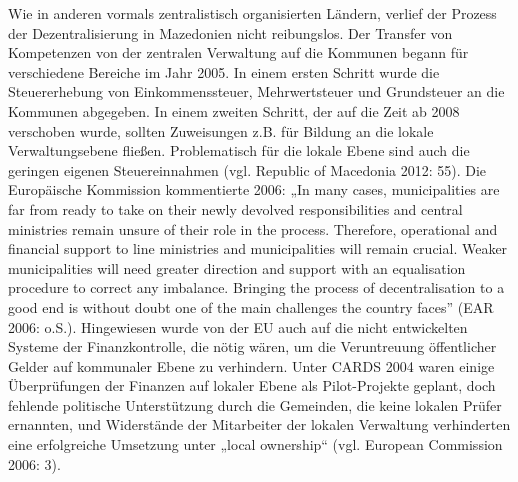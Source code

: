 Wie in anderen vormals zentralistisch organisierten Ländern, verlief der Prozess der Dezentralisierung in Mazedonien nicht reibungslos. Der Transfer von Kompetenzen von der zentralen Verwaltung auf die Kommunen begann für verschiedene Bereiche im Jahr 2005. In einem ersten Schritt wurde die Steuererhebung von Einkommenssteuer, Mehrwertsteuer und Grundsteuer an die Kommunen abgegeben. In einem zweiten Schritt, der auf die Zeit ab 2008 verschoben wurde, sollten Zuweisungen z.B. für Bildung an die lokale Verwaltungsebene fließen. Problematisch für die lokale Ebene sind auch die geringen eigenen Steuereinnahmen (vgl. Republic of Macedonia 2012: 55). Die Europäische Kommission kommentierte 2006: „In many cases, municipalities are far from ready to take on their newly devolved responsibilities and central ministries remain unsure of their role in the process. Therefore, operational and financial support to line ministries and municipalities will remain crucial. Weaker municipalities will need greater direction and support with an equalisation procedure to correct any imbalance. Bringing the process of decentralisation to a good end is without doubt one of the main challenges the country faces” (EAR 2006: o.S.). Hingewiesen wurde von der EU auch auf die nicht entwickelten Systeme der Finanzkontrolle, die nötig wären, um die Veruntreuung öffentlicher Gelder auf kommunaler Ebene zu verhindern. Unter CARDS 2004 waren einige Überprüfungen der Finanzen auf lokaler Ebene als Pilot-Projekte geplant, doch fehlende politische Unterstützung durch die Gemeinden, die keine lokalen Prüfer ernannten, und Widerstände der Mitarbeiter der lokalen Verwaltung verhinderten eine erfolgreiche Umsetzung unter „local ownership“ (vgl. European Commission 2006: 3).


